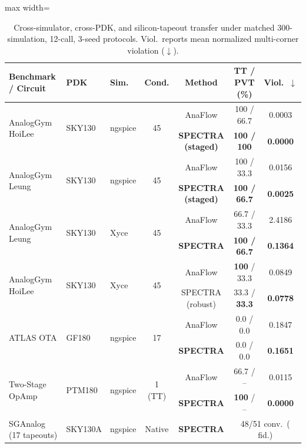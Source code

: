 \begin{table}[t]
\centering
\caption{Cross-simulator, cross-PDK, and silicon-tapeout transfer under matched 300-simulation, 12-call, 3-seed protocols. Viol.\ reports mean normalized multi-corner violation ($\downarrow$).}
\label{tab:cross_domain}
\scriptsize
\setlength{\tabcolsep}{1.8pt}
\begin{adjustbox}{max width=\columnwidth}
\begin{tabular}{@{}lllcccc@{}}
\toprule
Benchmark / Circuit & PDK & Sim. & Cond. & Method & TT / PVT (\%) & Viol.\ $\downarrow$ \\
\midrule
\multirow{2}{*}{AnalogGym HoiLee} & \multirow{2}{*}{SKY130} & \multirow{2}{*}{ngspice} & \multirow{2}{*}{45} & AnaFlow & 100 / 66.7 & 0.0003 \\
 & & & & \textbf{SPECTRA (staged)} & \textbf{100 / 100} & \textbf{0.0000} \\
\midrule
\multirow{2}{*}{AnalogGym Leung} & \multirow{2}{*}{SKY130} & \multirow{2}{*}{ngspice} & \multirow{2}{*}{45} & AnaFlow & 100 / 33.3 & 0.0156 \\
 & & & & \textbf{SPECTRA (staged)} & \textbf{100 / 66.7} & \textbf{0.0025} \\
\midrule
\multirow{2}{*}{AnalogGym Leung} & \multirow{2}{*}{SKY130} & \multirow{2}{*}{Xyce} & \multirow{2}{*}{45} & AnaFlow & 66.7 / 33.3 & 2.4186 \\
 & & & & \textbf{SPECTRA} & \textbf{100 / 66.7} & \textbf{0.1364} \\
\midrule
\multirow{2}{*}{AnalogGym HoiLee} & \multirow{2}{*}{SKY130} & \multirow{2}{*}{Xyce} & \multirow{2}{*}{45} & AnaFlow & \textbf{100} / 33.3 & 0.0849 \\
 & & & & SPECTRA (robust) & 33.3 / \textbf{33.3} & \textbf{0.0778} \\
\midrule
\multirow{2}{*}{ATLAS OTA} & \multirow{2}{*}{GF180} & \multirow{2}{*}{ngspice} & \multirow{2}{*}{17} & AnaFlow & 0.0 / 0.0 & 0.1847 \\
 & & & & \textbf{SPECTRA} & 0.0 / 0.0 & \textbf{0.1651} \\
\midrule
\multirow{2}{*}{Two-Stage OpAmp} & \multirow{2}{*}{PTM180} & \multirow{2}{*}{ngspice} & \multirow{2}{*}{1 (TT)} & AnaFlow & 66.7 / -- & 0.0115 \\
 & & & & \textbf{SPECTRA} & \textbf{100} / -- & \textbf{0.0000} \\
\midrule
SGAnalog (17 tapeouts) & SKY130A & ngspice & Native & \textbf{SPECTRA} & \multicolumn{2}{c}{48/51 conv.\ (\SGAnalogFidelity{} fid.)} \\
\bottomrule
\end{tabular}
\end{adjustbox}
\end{table}
